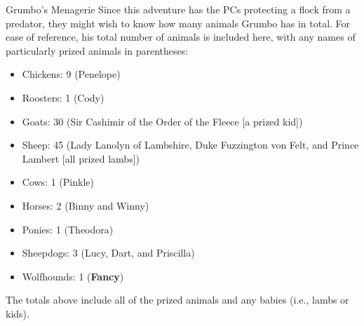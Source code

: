 \documentclass[10pt,a4paper,twoside,bg=print,twocolumn,openany,nodeprecatedcode]{dndbook}
\begin{document}
\begin{DndSidebar}[float=!b]{Grumbo's Menagerie}
Since this adventure has the PCs protecting a flock from a predator, they might wish to know how many animals Grumbo has in total. For ease of reference, his total number of animals is included here, with any names of particularly prized animals in parentheses:




\begin{itemize}
\item Chickens: 9 (Penelope)
\item Roosters: 1 (Cody)
\item Goats: 30 (Sir Cashimir of the Order of the Fleece [a prized kid])
\item Sheep: 45 (Lady Lanolyn of Lambshire, Duke Fuzzington von Felt, and Prince Lambert [all prized lambs])
\item Cows: 1 (Pinkle)
\item Horses: 2 (Binny and Winny)
\item Ponies: 1 (Theodora)
\item Sheepdogs: 3 (Lucy, Dart, and Priscilla)
\item Wolfhounds: 1 (\textbf{Fancy})
\end{itemize}



The totals above include all of the prized animals and any babies (i.e., lambs or kids).



\end{DndSidebar}
\end{document}
